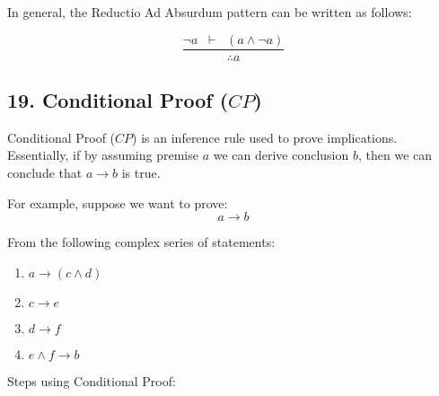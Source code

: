 In general, the Reductio Ad Absurdum pattern can be written as follows:

\[
\frac{\neg a \;\; \vdash \;\; (a \land \neg a)}{\therefore a}
\]

\subsection{\texorpdfstring{19. Conditional Proof
(\(CP\))}{19. Conditional Proof (CP)}}\label{conditional-proof-cp}

Conditional Proof (\(CP\)) is an inference rule used to prove
implications. Essentially, if by assuming premise \(a\) we can derive
conclusion \(b\), then we can conclude that \(a \rightarrow b\) is true.

For example, suppose we want to prove:\\
\[a \rightarrow b\]

From the following complex series of statements:

\begin{enumerate}
\def\labelenumi{\arabic{enumi}.}
\tightlist
\item
  \(a \rightarrow (c \land d)\)\\
\item
  \(c \rightarrow e\)\\
\item
  \(d \rightarrow f\)\\
\item
  \(e \land f \rightarrow b\)
\end{enumerate}

Steps using Conditional Proof:

